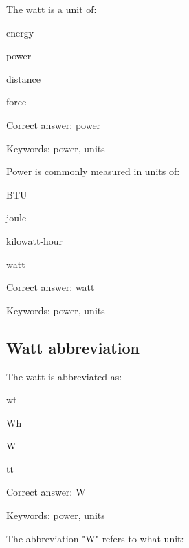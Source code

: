 \begin{question}
	\item The watt is a unit of:
\end{question}

\begin{answer}
	\item energy
	\item power
	\item distance
	\item force
\end{answer}

Correct answer: power

Keywords: power, units

\begin{question}
	\item Power is commonly measured in units of:
\end{question}

\begin{answer}
	\item BTU
	\item joule
	\item kilowatt-hour
	\item watt
\end{answer}

Correct answer: watt

Keywords: power, units

\subsection{Watt abbreviation}

\begin{question}
	\item The watt is abbreviated as:
\end{question}

\begin{answer}
	\item wt
	\item Wh
	\item W
	\item tt
\end{answer}

Correct answer: W

Keywords: power, units

\begin{question}
	\item The abbreviation "W" refers to what unit:
\end{question}

